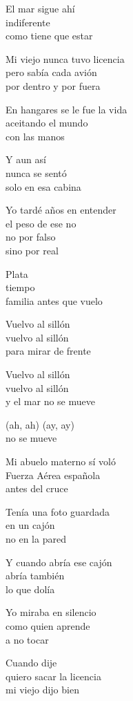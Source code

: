 \begin{lyrics}
El mar sigue ahí\\
indiferente\\
como tiene que estar

Mi viejo nunca tuvo licencia\\
pero sabía cada avión\\
por dentro y por fuera

En hangares se le fue la vida\\
aceitando el mundo\\
con las manos

Y aun así\\
nunca se sentó\\
solo en esa cabina

Yo tardé años en entender\\
el peso de ese no\\
no por falso\\
sino por real

Plata\\
tiempo\\
familia antes que vuelo

Vuelvo al sillón\\
vuelvo al sillón\\
para mirar de frente

Vuelvo al sillón\\
vuelvo al sillón\\
y el mar no se mueve

(ah, ah)
(ay, ay)\\
no se mueve

Mi abuelo materno sí voló\\
Fuerza Aérea española\\
antes del cruce

Tenía una foto guardada\\
en un cajón\\
no en la pared

Y cuando abría ese cajón\\
abría también\\
lo que dolía

Yo miraba en silencio\\
como quien aprende\\
a no tocar

Cuando dije\\
quiero sacar la licencia\\
mi viejo dijo bien


\end{lyrics}
